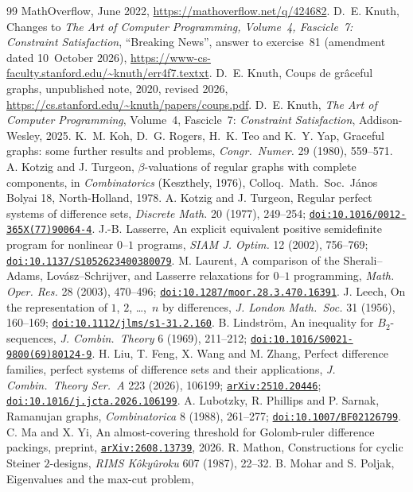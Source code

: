 \documentclass[11pt]{amsart}
\theoremstyle{tplain}
\theoremstyle{tdefinition}
\theoremstyle{tremark}
\newcommand{\doi}[1]{\href{https://doi.org/#1}{\nolinkurl{doi:#1}}}
\newcommand{\arxiv}[1]{\href{https://arxiv.org/abs/#1}{\nolinkurl{arXiv:#1}}}
\begin{document}
\begin{thebibliography}{99}
MathOverflow, June 2022, \url{https://mathoverflow.net/q/424682}.
D.~E. Knuth, Changes to \emph{The Art of Computer Programming, Volume~4,
Fascicle~7: Constraint Satisfaction}, ``Breaking News'', answer to
exercise~81 (amendment dated 10~October 2026),
\url{https://www-cs-faculty.stanford.edu/~knuth/err4f7.textxt}.
D.~E. Knuth, Coups de gr\^aceful graphs, unpublished note, 2020, revised
2026, \url{https://cs.stanford.edu/~knuth/papers/coups.pdf}.
D.~E. Knuth, \emph{The Art of Computer Programming}, Volume~4, Fascicle~7:
\emph{Constraint Satisfaction}, Addison-Wesley, 2025.
K.~M. Koh, D.~G. Rogers, H.~K. Teo and K.~Y. Yap, Graceful graphs: some
further results and problems, \emph{Congr.\ Numer.} 29 (1980), 559--571.
A. Kotzig and J. Turgeon, $\beta$-valuations of regular graphs with
complete components, in \emph{Combinatorics} (Keszthely, 1976),
Colloq.\ Math.\ Soc.\ J\'anos Bolyai 18, North-Holland, 1978.
A. Kotzig and J. Turgeon, Regular perfect systems of difference sets,
\emph{Discrete Math.} 20 (1977), 249--254; \doi{10.1016/0012-365X(77)90064-4}.
J.-B. Lasserre, An explicit equivalent positive semidefinite program for
nonlinear $0$--$1$ programs, \emph{SIAM J. Optim.} 12 (2002), 756--769;
\doi{10.1137/S1052623400380079}.
M. Laurent, A comparison of the Sherali--Adams, Lov\'asz--Schrijver, and
Lasserre relaxations for $0$--$1$ programming, \emph{Math. Oper. Res.} 28
(2003), 470--496; \doi{10.1287/moor.28.3.470.16391}.
J. Leech, On the representation of $1$, $2$, \dots,~$n$ by differences,
\emph{J. London Math.\ Soc.} 31 (1956), 160--169; \doi{10.1112/jlms/s1-31.2.160}.
B. Lindstr\"om, An inequality for $B_2$-sequences, \emph{J. Combin.\ Theory}
6 (1969), 211--212; \doi{10.1016/S0021-9800(69)80124-9}.
H. Liu, T. Feng, X. Wang and M. Zhang, Perfect difference families, perfect
systems of difference sets and their applications, \emph{J. Combin.\ Theory
Ser.~A} 223 (2026), 106199; \arxiv{2510.20446}; \doi{10.1016/j.jcta.2026.106199}.
A. Lubotzky, R. Phillips and P. Sarnak, Ramanujan graphs, \emph{Combinatorica}
8 (1988), 261--277; \doi{10.1007/BF02126799}.
C. Ma and X. Yi, An almost-covering threshold for Golomb-ruler difference
packings, preprint, \arxiv{2608.13739}, 2026.
R. Mathon, Constructions for cyclic Steiner $2$-designs, \emph{RIMS
K\^oky\^uroku} 607 (1987), 22--32.
B. Mohar and S. Poljak, Eigenvalues and the max-cut problem,

\end{thebibliography}
\end{document}
